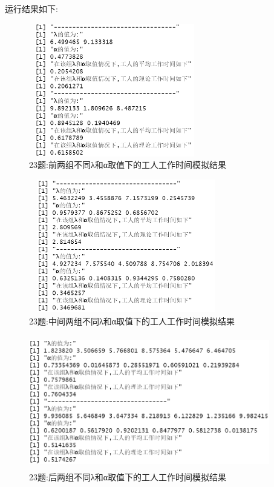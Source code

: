 \documentclass{book}
\begin{document}
运行结果如下:
\begin{figure}[H]
  \centering
  \includegraphics*[height = 5.8cm, width = 7.5cm]{gramFile/第二十三题/前两组不同λ和α取值下的工人工作时间模拟结果.PNG}
  \caption{23题:前两组不同λ和α取值下的工人工作时间模拟结果}
\end{figure}
\begin{figure}[H]
  \centering
  \includegraphics*[height = 5.8cm, width = 8.5cm]{gramFile/第二十三题/中间两组不同λ和α取值下的工人工作时间模拟结果.PNG}
  \caption{23题:中间两组不同λ和α取值下的工人工作时间模拟结果}
\end{figure}
\begin{figure}[H]
  \centering
  \includegraphics*[height = 5.8cm, width = 10.5cm]{gramFile/第二十三题/后两组不同λ和α取值下的工人工作时间模拟结果.PNG}
  \caption{23题:后两组不同λ和α取值下的工人工作时间模拟结果}
\end{figure}
\end{document}

